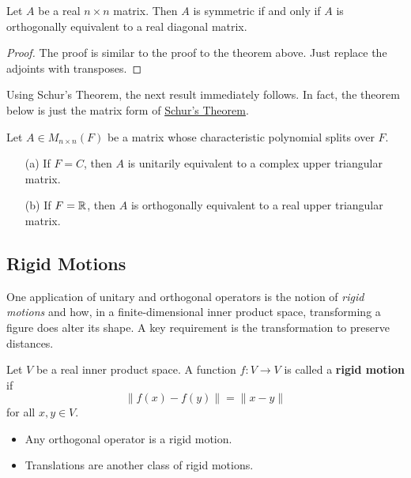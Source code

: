 \begin{theorem}
   Let \( A  \) be a real \(  n \times n  \) matrix. Then \( A  \) is symmetric if and only if \( A  \) is orthogonally equivalent to a real diagonal matrix. 
\end{theorem}
\begin{proof}
The proof is similar to the proof to the theorem above. Just replace the adjoints with transposes.
\end{proof}

Using Schur's Theorem, the next result immediately follows. In fact, the theorem below is just the matrix form of {\hyperref[Schur]{Schur's Theorem}}.

\begin{theorem}[Schur]
  Let \( A \in {M}_{ n \times n }(F) \) be a matrix whose characteristic polynomial splits over \( F  \).    
  \begin{enumerate}
      \item[(a)] If \( F = C  \), then \( A  \) is unitarily equivalent to a complex upper triangular matrix.
        \item[(b)] If \( F = \mathbb{R}  \), then \( A  \) is orthogonally equivalent to a real upper triangular matrix.
  \end{enumerate}
\end{theorem}

\subsection{Rigid Motions}

One application of unitary and orthogonal operators is the notion of \textit{rigid motions} and how, in a finite-dimensional inner product space, transforming a figure does alter its shape. A key requirement is the transformation to preserve distances.

\begin{definition}
    Let \( V  \) be a real inner product space. A function \( f: V \to V  \) is called a \textbf{rigid motion} if 
    \[ \|f(x) - f(y)\| = \| x-  y\|  \]
    for all \( x,y \in V  \).
\end{definition}

\begin{itemize}
    \item Any orthogonal operator is a rigid motion.
    \item Translations are another class of rigid motions.
\end{itemize}

